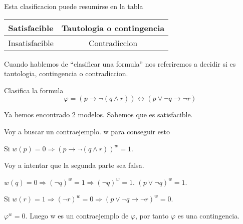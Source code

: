 \begin{remark}
	Esta clasificacion puede resumirse en la tabla
	\begin{table}[H]
		\centering
		\begin{tabular}{|c|c|}
			\hline
			Satisfacible   & Tautologia o contingencia \\ \hline
			\hline
			Insatisfacible & Contradiccion             \\
			\hline
		\end{tabular}

		\label{tab:label}
	\end{table}
	Cuando hablemos de ``clasificar una formula'' nos referiremos a decidir si es tautologia, contingencia o contradiccion.
\end{remark}
\begin{example}
	Clasifica la formula
	\[
		\varphi = (p \rightarrow \neg(q \wedge  r)) \leftrightarrow (p \vee \neg q \rightarrow \neg r )
	\]

	Ya hemos encontrado 2 modelos. Sabemos que es satisfacible.

	Voy a buscar un contraejemplo. w para conseguir esto

	Si \(w(p) = 0 \Rightarrow (p \rightarrow \neg (q \wedge  r))^{w} = 1\).

	Voy a intentar que la segunda parte sea falsa.

	\(w(q) = 0 \Rightarrow (\neg q)^{w} = 1 \Rightarrow (\neg q )^{w} = 1 \). \((p \vee \neg q)^{w} = 1 \).

	Si \(w(r) = 1 \Rightarrow (\neg r)^{w} = 0 \Rightarrow (p \vee \neg q \rightarrow \neg r)^{w} = 0  \).

	\(\varphi^{w} = 0 \). Luego w es un contraejemplo de \(\varphi\), por tanto \(\varphi\) es una contingencia.
\end{example}

